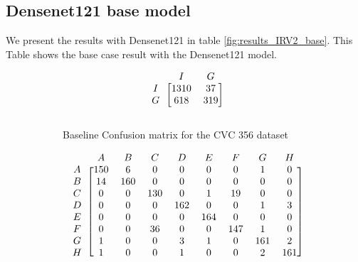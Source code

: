 \subsection{Densenet121 base model}

We present the results with Densenet121 in table \ref{fig:results_IRV2_base}.
This Table shows the base case result with the Densenet121 model. 

\begin{figure}[h]
\myfontsize
\caption*{\footnotesize \textmd{ \textbf{A}:{dyed-lifted-polyps} , \textbf{B}:{dyed-resection-margins} , \textbf{C}:{esophagitis} , \textbf{D}:{normal-cecum} , \textbf{E}:{normal-pylorus} , \textbf{F}:{normal-z-line} , \textbf{G}:{polyps} , \textbf{H}:{ulcerative-colitis} , \textbf{I}:{non-polyp}}}

\begin{subfigure}[b]{0.25\textwidth}
     
\[
\begin{blockarray}{ccc}
& I & G  \\
\begin{block}{c[cc]}
        I&1310 &  37\\
        G& 618 &  319\\
\end{block}
\end{blockarray}
 \]         

\caption{Baseline Confusion matrix for the CVC 356 dataset}
\label{mat:cvc356_CM_DN121_base}
\end{subfigure}
\begin{subfigure}[b]{0.49\textwidth}  
\scriptsize     
\[
\begin{blockarray}{ccccccccc}
& A & B & C & D & E & F & G & H \\
\begin{block}{c[cccccccc]}
A&150 & 6 & 0 & 0 & 0 & 0 & 1 & 0\\
B& 14 & 160 & 0 & 0 & 0 & 0 & 0 & 0\\
C&  0 & 0 & 130 & 0 & 1 & 19 & 0 & 0\\
D&  0 & 0 & 0 & 162 & 0 & 0 & 1 & 3\\
E&  0 & 0 & 0 & 0 & 164 & 0 & 0 & 0\\
F&  0 & 0 & 36 & 0 & 0 & 147 & 1 & 0\\
G&  1 & 0 & 0 & 3 & 1 & 0 & 161 & 2\\
H&  1 & 0 & 0 & 1 & 0 & 0 & 2 & 161\\
\end{block}
\end{blockarray}
 \]        
        

\end{subfigure}
\end{figure}
